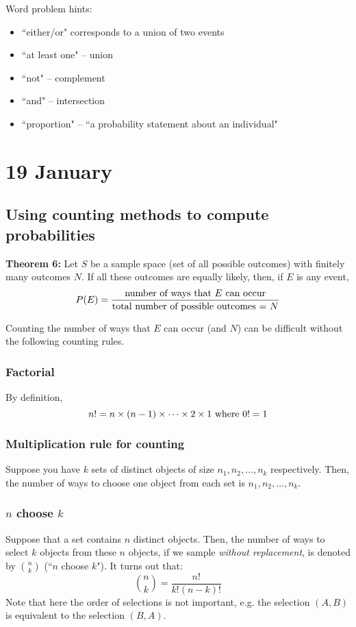 \documentclass[12pt]{article}
\begin{document}
Word problem hints:
\begin{itemize}
    \item ``either/or" corresponds to a union of two events
    \item ``at least one" -- union
    \item ``not" -- complement
    \item ``and" -- intersection
    \item ``proportion" -- ``a probability statement about an individual"
\end{itemize}

\section{19 January}
\subsection{Using counting methods to compute probabilities}
\textbf{Theorem 6:} Let $S$ be a sample space (set of all possible outcomes) with finitely many outcomes $N$. If all these outcomes are equally likely, then, if $E$ is any event,
\[
    P(E) = \frac{\textnormal{number of ways that $E$ can occur}}{\textnormal{total number of possible outcomes = $N$}}
\]

Counting the number of ways that $E$ can occur (and $N$) can be difficult without the following counting rules.

\subsubsection{Factorial}
By definition,
\[
    n! = n \times(n-1) \times \dots \times 2 \times 1 \textnormal{ where } 0! = 1
\]

\subsubsection{Multiplication rule for counting}
Suppose you have $k$ sets of distinct objects of size $n_1, n_2, \dots, n_k$ respectively. Then, the number of ways to choose one object from each set is $n_1, n_2, \dots, n_k$.

\subsubsection{$n$ choose $k$}
Suppose that a set contains $n$ distinct objects. Then, the number of ways to select $k$ objects from these $n$ objects, if we sample \emph{without replacement}, is denoted by ${n \choose k}$ (``$n$ choose $k$"). It turns out that:
\[
    {n \choose k} = \frac{n!}{k! (n-k)!}
\]
Note that here the order of selections is not important, e.g. the selection $(A,B)$ is equivalent to the selection $(B,A)$.
\end{document}
